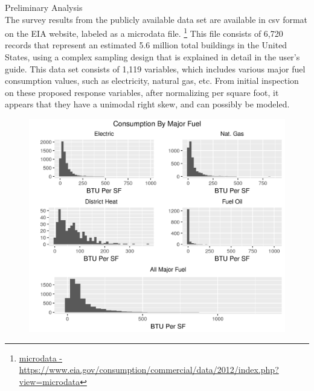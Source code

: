 {\Large {Preliminary Analysis}}
\\[0.125in]
The survey results from the publicly available data set are available in csv format on the EIA website, labeled as a microdata file. \footnote{\href{https://www.eia.gov/consumption/commercial/data/2012/index.php?view=microdata}{microdata - \url{https://www.eia.gov/consumption/commercial/data/2012/index.php?view=microdata}}}  This file consists of 6,720 records that represent an estimated 5.6 million total buildings in the United States, using a complex sampling design that is explained in detail in the user's guide.  This data set consists of 1,119 variables, which includes various major fuel consumption values, such as electricity, natural gas, etc.  From initial inspection on these proposed response variables, after normalizing per square foot, it appears that they have a unimodal right skew, and can possibly be modeled.\\

\begin{figure}[h]
\includegraphics[width=\textwidth]{major_fuels_preliminary_analysis.png}
\centering
\end{figure}
